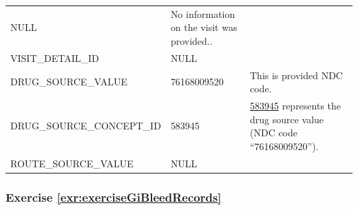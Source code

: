 \documentclass[11pt]{book}
\theoremstyle{definition}
\theoremstyle{definition}
\theoremstyle{definition}
\theoremstyle{remark}
\begin{document}
\begin{longtable}[]{@{}lll@{}}
\begin{minipage}[t]{0.15\columnwidth}
NULL\strut
\end{minipage} & \begin{minipage}[t]{0.49\columnwidth}\raggedright
No information on the visit was provided..\strut
\end{minipage}\tabularnewline
\begin{minipage}[t]{0.28\columnwidth}\raggedright
VISIT\_DETAIL\_ID\strut
\end{minipage} & \begin{minipage}[t]{0.15\columnwidth}\raggedright
NULL\strut
\end{minipage} & \begin{minipage}[t]{0.49\columnwidth}\raggedright
\strut
\end{minipage}\tabularnewline
\begin{minipage}[t]{0.28\columnwidth}\raggedright
DRUG\_SOURCE\_VALUE\strut
\end{minipage} & \begin{minipage}[t]{0.15\columnwidth}\raggedright
76168009520\strut
\end{minipage} & \begin{minipage}[t]{0.49\columnwidth}\raggedright
This is provided NDC code.\strut
\end{minipage}\tabularnewline
\begin{minipage}[t]{0.28\columnwidth}\raggedright
DRUG\_SOURCE\_CONCEPT\_ID\strut
\end{minipage} & \begin{minipage}[t]{0.15\columnwidth}\raggedright
583945\strut
\end{minipage} & \begin{minipage}[t]{0.49\columnwidth}\raggedright
\href{http://athena.ohdsi.org/search-terms/terms/750264}{583945} represents the drug source value (NDC code ``76168009520'').\strut
\end{minipage}\tabularnewline
\begin{minipage}[t]{0.28\columnwidth}\raggedright
ROUTE\_SOURCE\_VALUE\strut
\end{minipage} & \begin{minipage}[t]{0.15\columnwidth}\raggedright
NULL\strut
\end{minipage} & \begin{minipage}[t]{0.49\columnwidth}\raggedright
\strut
\end{minipage}\tabularnewline
\bottomrule
\end{longtable}

\hypertarget{exercise-refexrexercisegibleedrecords}{%
\subsubsection*{Exercise \ref{exr:exerciseGiBleedRecords}}\label{exercise-refexrexercisegibleedrecords}}
\end{document}
